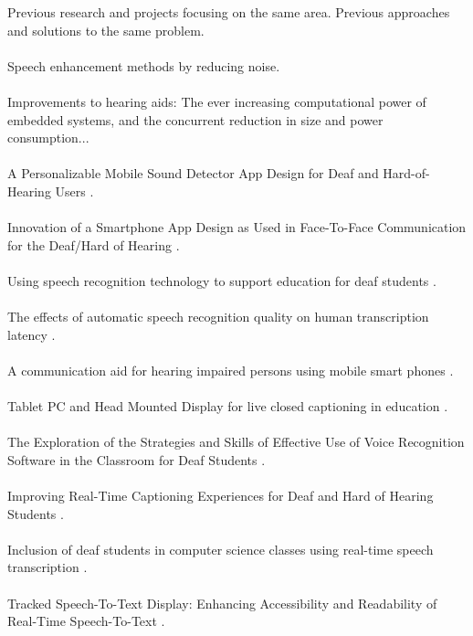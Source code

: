 \documentclass[english, 12pt, a4paper, pdftex, elec, utf8]{aaltothesis}
\begin{document}
Previous research and projects focusing on the same area. Previous approaches and solutions to the same problem. \\\\
Speech enhancement methods by reducing noise. \cite{goehring2016speech} \\\\
Improvements to hearing aids: The ever increasing computational power of embedded systems, and the concurrent reduction in size and power consumption... \\\\
A Personalizable Mobile Sound Detector App Design for Deaf and Hard-of-Hearing Users \cite{bragg2016personalizable}. \\\\
Innovation of a Smartphone App Design as Used in Face-To-Face Communication for the Deaf/Hard of Hearing \cite{chang2015}. \\\\
Using speech recognition technology to support education for deaf students \cite{fen2010using}. \\\\
The effects of automatic speech recognition quality on human transcription latency \cite{gaur2016effects}. \\\\
A communication aid for hearing impaired persons using mobile smart phones \cite{hirayama2011communication}. \\\\
Tablet PC and Head Mounted Display for live closed captioning in education \cite{jimenez2011tablet}. \\\\
The Exploration of the Strategies and Skills of Effective Use of Voice Recognition Software in the Classroom for Deaf Students \cite{jun2010exploration}. \\\\
Improving Real-Time Captioning Experiences for Deaf and Hard of Hearing Students \cite{kawas2016improving}. \\\\
Inclusion of deaf students in computer science classes using real-time speech transcription \cite{kheir2007inclusion}. \\\\
Tracked Speech-To-Text Display: Enhancing Accessibility and Readability of Real-Time Speech-To-Text \cite{kushalnagar2015tracked}. \\\\
\end{document}
